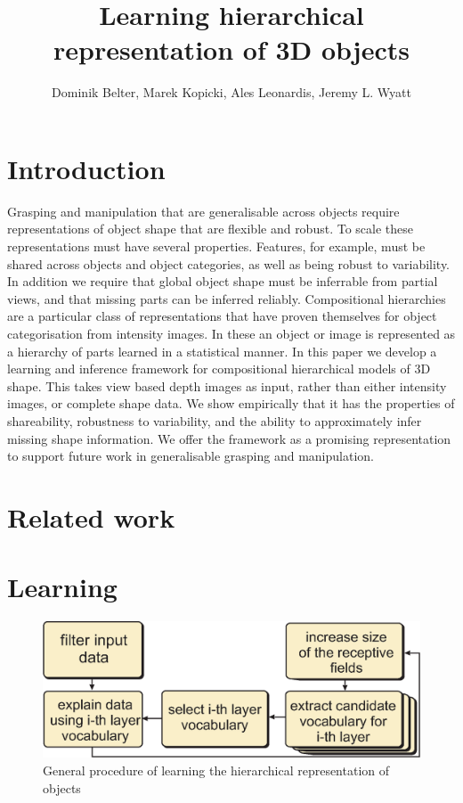 \documentclass[letterpaper,10pt,conference]{ieeeconf}  %
\title{\LARGE \bf
 Learning hierarchical representation of 3D objects
}
\author{Dominik Belter, Marek Kopicki, Ales Leonardis, Jeremy L. Wyatt%
}
\begin{document}
\maketitle
\thispagestyle{empty}
\pagestyle{empty}


\begin{abstract}
\end{abstract}



\section{Introduction}

Grasping and manipulation that are generalisable across objects require representations of object shape that are flexible and robust. To scale these representations must have several properties.  Features, for example, must be shared across objects and object categories, as well as being robust to variability. In addition we require that global object shape must be inferrable from partial views, and that missing parts can be inferred reliably. Compositional hierarchies are a particular class of representations that have proven themselves for object categorisation from intensity images. In these an object or image is represented as a hierarchy of parts learned in a statistical manner. In this paper we develop a learning and inference framework for compositional hierarchical models of 3D shape. This takes view based depth images as input, rather than either intensity images, or complete shape data. We show empirically that it has the properties of shareability, robustness to variability, and the ability to approximately infer missing shape information. We offer the framework as a promising representation to support future work in generalisable grasping and manipulation.

\section{Related work}

\section{Learning}

\begin{figure}[t]
 \centering
\includegraphics[width=0.9\columnwidth]{../images/learningGeneral.eps}
\caption{General procedure of learning the hierarchical representation of objects}
 \label{hopProc}
\end{figure}
\end{document}
